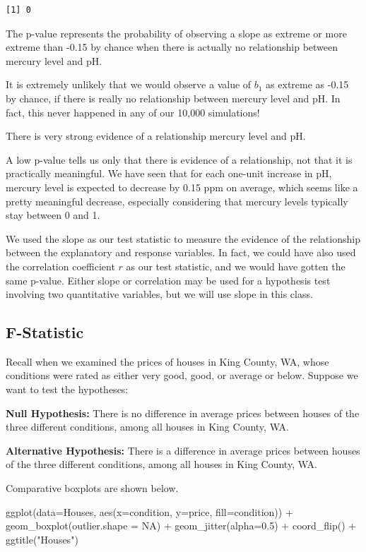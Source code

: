 \documentclass[
  letterpaper,
  DIV=11,
  numbers=noendperiod]{scrreprt}
\newenvironment{Shaded}{\begin{snugshade}}{\end{snugshade}}
\newcommand{\AttributeTok}[1]{\textcolor[rgb]{0.40,0.45,0.13}{#1}}
\newcommand{\ConstantTok}[1]{\textcolor[rgb]{0.56,0.35,0.01}{#1}}
\newcommand{\FloatTok}[1]{\textcolor[rgb]{0.68,0.00,0.00}{#1}}
\newcommand{\FunctionTok}[1]{\textcolor[rgb]{0.28,0.35,0.67}{#1}}
\newcommand{\NormalTok}[1]{\textcolor[rgb]{0.00,0.23,0.31}{#1}}
\newcommand{\SpecialCharTok}[1]{\textcolor[rgb]{0.37,0.37,0.37}{#1}}
\newcommand{\StringTok}[1]{\textcolor[rgb]{0.13,0.47,0.30}{#1}}
\begin{document}
\begin{verbatim}
[1] 0
\end{verbatim}

The p-value represents the probability of observing a slope as extreme
or more extreme than -0.15 by chance when there is actually no
relationship between mercury level and pH.

It is extremely unlikely that we would observe a value of \(b_1\) as
extreme as -0.15 by chance, if there is really no relationship between
mercury level and pH. In fact, this never happened in any of our 10,000
simulations!

There is very strong evidence of a relationship mercury level and pH.

A low p-value tells us only that there is evidence of a relationship,
not that it is practically meaningful. We have seen that for each
one-unit increase in pH, mercury level is expected to decrease by 0.15
ppm on average, which seems like a pretty meaningful decrease,
especially considering that mercury levels typically stay between 0 and
1.

We used the slope as our test statistic to measure the evidence of the
relationship between the explanatory and response variables. In fact, we
could have also used the correlation coefficient \(r\) as our test
statistic, and we would have gotten the same p-value. Either slope or
correlation may be used for a hypothesis test involving two quantitative
variables, but we will use slope in this class.

\subsection{F-Statistic}\label{f-statistic}

Recall when we examined the prices of houses in King County, WA, whose
conditions were rated as either very good, good, or average or below.
Suppose we want to test the hypotheses:

\textbf{Null Hypothesis:} There is no difference in average prices
between houses of the three different conditions, among all houses in
King County, WA.

\textbf{Alternative Hypothesis:} There is a difference in average prices
between houses of the three different conditions, among all houses in
King County, WA.

Comparative boxplots are shown below.

\begin{Shaded}
\begin{Highlighting}[]
\FunctionTok{ggplot}\NormalTok{(}\AttributeTok{data=}\NormalTok{Houses, }\FunctionTok{aes}\NormalTok{(}\AttributeTok{x=}\NormalTok{condition, }\AttributeTok{y=}\NormalTok{price, }\AttributeTok{fill=}\NormalTok{condition)) }\SpecialCharTok{+} 
  \FunctionTok{geom\_boxplot}\NormalTok{(}\AttributeTok{outlier.shape =} \ConstantTok{NA}\NormalTok{) }\SpecialCharTok{+} \FunctionTok{geom\_jitter}\NormalTok{(}\AttributeTok{alpha=}\FloatTok{0.5}\NormalTok{) }\SpecialCharTok{+} \FunctionTok{coord\_flip}\NormalTok{() }\SpecialCharTok{+} \FunctionTok{ggtitle}\NormalTok{(}\StringTok{"Houses"}\NormalTok{)}
\end{Highlighting}
\end{Shaded}
\end{document}
